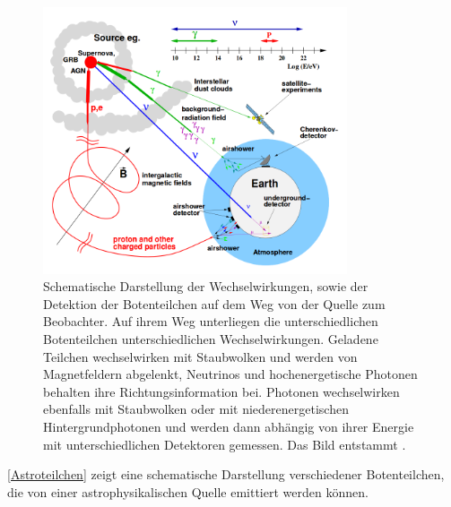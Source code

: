 \begin{figure}
    \centering
    \includegraphics[width=0.8\textwidth]{./Plots/02_Astroteilchenphysik/Astroteilchen.png}
    \caption{Schematische Darstellung der Wechselwirkungen, sowie der Detektion der Botenteilchen auf dem Weg von der Quelle zum Beobachter.
    Auf ihrem Weg unterliegen die unterschiedlichen Botenteilchen unterschiedlichen Wechselwirkungen. 
    Geladene Teilchen wechselwirken mit Staubwolken und werden von Magnetfeldern abgelenkt, Neutrinos und hochenergetische Photonen behalten ihre Richtungsinformation bei.
    Photonen wechselwirken ebenfalls mit Staubwolken oder mit niederenergetischen Hintergrundphotonen und werden dann abhängig von ihrer Energie mit unterschiedlichen Detektoren gemessen. 
    Das Bild entstammt \cite{DissMarlene}.}
    \label{Astroteilchen}
\end{figure}


\autoref{Astroteilchen} zeigt eine schematische Darstellung verschiedener Botenteilchen, die von einer astrophysikalischen Quelle emittiert werden können.

